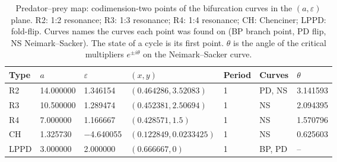 \begin{table}
\centering
\caption{Predator--prey map: codimension-two points of the bifurcation curves in the $(a, \varepsilon)$ plane. R2: 1:2 resonance; R3: 1:3 resonance; R4: 1:4 resonance; CH: Chenciner; LPPD: fold-flip. Curves names the curves each point was found on (BP branch point, PD flip, NS Neimark--Sacker). The state of a cycle is its first point. $\theta$ is the angle of the critical multipliers $e^{\pm i\theta}$ on the Neimark--Sacker curve.}
\label{tab:predator-prey-map-plane-points}
\begin{tabular}{@{}lllllll@{}}
\toprule
Type & $a$ & $\varepsilon$ & $(x, y)$ & Period & Curves & $\theta$ \\
\midrule
R2 & \num{14.000000} & \num{1.346154} & $(\num{0.464286}, \num{3.52083})$ & \num{1} & PD, NS & \num{3.141593} \\
R3 & \num{10.500000} & \num{1.289474} & $(\num{0.452381}, \num{2.50694})$ & \num{1} & NS & \num{2.094395} \\
R4 & \num{7.000000} & \num{1.166667} & $(\num{0.428571}, \num{1.5})$ & \num{1} & NS & \num{1.570796} \\
CH & \num{1.325730} & \num{-4.640055} & $(\num{0.122849}, \num{0.0233425})$ & \num{1} & NS & \num{0.625603} \\
LPPD & \num{3.000000} & \num{2.000000} & $(\num{0.666667}, \num{0})$ & \num{1} & BP, PD & -- \\
\bottomrule
\end{tabular}
\end{table}
